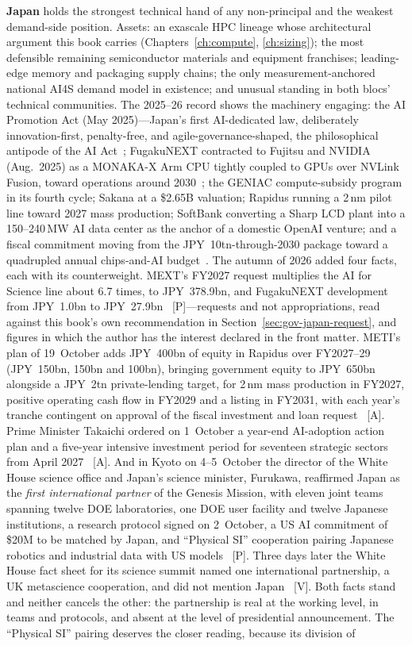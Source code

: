 \textbf{Japan} holds the strongest technical hand of any non-principal and the weakest demand-side position. Assets: an exascale HPC lineage whose architectural argument this book carries (Chapters~\ref{ch:compute}, \ref{ch:sizing}); the most defensible remaining semiconductor materials and equipment franchises; leading-edge memory and packaging supply chains; the only measurement-anchored national AI4S demand model in existence; and unusual standing in both blocs' technical communities. The 2025--26 record shows the machinery engaging: the AI Promotion Act (May 2025)---Japan's first AI-dedicated law, deliberately innovation-first, penalty-free, and agile-governance-shaped, the philosophical antipode of the AI Act~\cite{japan-ai-act}; FugakuNEXT contracted to Fujitsu and NVIDIA (Aug.\ 2025) as a MONAKA-X Arm CPU tightly coupled to GPUs over NVLink Fusion, toward operations around 2030~\cite{fugakunext}; the GENIAC compute-subsidy program in its fourth cycle; Sakana at a \$2.65B valuation; Rapidus running a 2\,nm pilot line toward 2027 mass production; SoftBank converting a Sharp LCD plant into a 150--240\,MW AI data center as the anchor of a domestic OpenAI venture; and a fiscal commitment moving from the JPY~10tn-through-2030 package toward a quadrupled annual chips-and-AI budget~\cite{japan-budget}. The autumn of 2026 added four facts, each with its counterweight. MEXT's FY2027 request multiplies the AI for Science line about 6.7 times, to JPY~378.9bn, and FugakuNEXT development from JPY~1.0bn to JPY~27.9bn~\cite{gov-mext-fy2027} [P]---requests and not appropriations, read against this book's own recommendation in Section~\ref{sec:gov-japan-request}, and figures in which the author has the interest declared in the front matter. METI's plan of 19~October adds JPY~400bn of equity in Rapidus over FY2027--29 (JPY~150bn, 150bn and 100bn), bringing government equity to JPY~650bn alongside a JPY~2tn private-lending target, for 2\,nm mass production in FY2027, positive operating cash flow in FY2029 and a listing in FY2031, with each year's tranche contingent on approval of the fiscal investment and loan request~\cite{gov-rapidus} [A]. Prime Minister Takaichi ordered on 1~October a year-end AI-adoption action plan and a five-year intensive investment period for seventeen strategic sectors from April 2027~\cite{gov-takaichi} [A]. And in Kyoto on 4--5~October the director of the White House science office and Japan's science minister, Furukawa, reaffirmed Japan as the \emph{first international partner} of the Genesis Mission, with eleven joint teams spanning twelve DOE laboratories, one DOE user facility and twelve Japanese institutions, a research protocol signed on 2~October, a US AI commitment of \$20M to be matched by Japan, and ``Physical SI'' cooperation pairing Japanese robotics and industrial data with US models~\cite{gov-japan-us-kyoto} [P]. Three days later the White House fact sheet for its science summit named one international partnership, a UK metascience cooperation, and did not mention Japan~\cite{sci-wh-summit} [V]. Both facts stand and neither cancels the other: the partnership is real at the working level, in teams and protocols, and absent at the level of presidential announcement. The ``Physical SI'' pairing deserves the closer reading, because its division of 